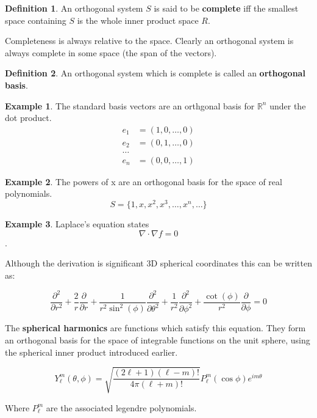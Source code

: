 \documentclass{article}
\theoremstyle{definition}
\newtheorem{definition}{Definition}
\theoremstyle{definition}
\newtheorem{example}{Example}
\begin{document}
\begin{definition}
    An orthogonal system $S$ is said to be \textbf{complete} iff the smallest space containing $S$ is the whole inner product space $R$.
\end{definition}

Completeness is always relative to the space. Clearly an orthogonal system is always complete in some space (the span of the vectors).

\begin{definition}
    An orthogonal system which is complete is called an \textbf{orthogonal basis}.
\end{definition}

\begin{example}
    The standard basis vectors are an orthgonal basis for $\mathbb{R}^{n}$ under the dot product.
    \begin{equation}
        \begin{split}
            e_{1}&=( 1, 0, \ldots, 0 ) \\
            e_{2}&=( 0, 1, \ldots, 0 ) \\
            \ldots \\
            e_{n}&=( 0, 0, \ldots, 1 ) 
        \end{split}
    \end{equation}
\end{example}

\begin{example}
    The powers of x are an orthogonal basis for the space of real polynomials.
     $$S=\{ 1, x, x^{2}, x^{3}, \ldots, x^{n}, \ldots \}$$
\end{example}

\begin{example}
    Laplace's equation states
    $$\nabla\cdot\nabla f=0$$.

    Although the derivation is significant\cite{laplace-equation} 3D spherical coordinates this can be written as:

    $$\frac{\partial^{2}}{\partial r^{2}}+\frac{2}{r}\frac{\partial}{\partial r} + \frac{1}{r^{2}\sin^{2}(\phi)}\frac{\partial^{2}}{\partial \theta^{2}}+\frac{1}{r^{2}}\frac{\partial^{2}}{\partial \phi^{2}}+\frac{\cot(\phi)}{r^{2}}\frac{\partial}{\partial \phi}=0$$

    The \textbf{spherical harmonics} are functions which satisfy this equation. They form an orthogonal basis for the space of integrable functions on the unit sphere, using the spherical inner product introduced earlier.

    $$Y_{\ell}^{m}(\theta, \phi)=\sqrt{\frac{(2\ell +1)(\ell-m)!}{4\pi(\ell+m)!}}P_{\ell}^{m}(\cos\phi)e^{im\theta}$$

    Where $P_{\ell}^{m}$ are the associated legendre polynomials.
\end{example}
\end{document}
